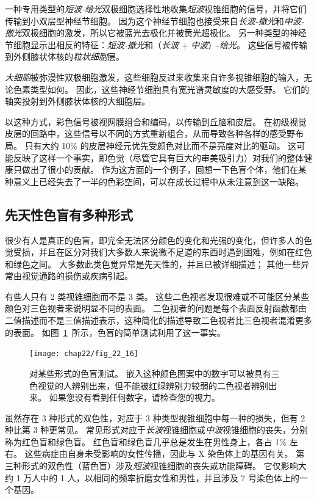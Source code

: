 一种专用类型的\textit{短波-给光}双极细胞选择性地收集\textit{短波}视锥细胞的信号，并将它们传输到小双层型神经节细胞。
因为这个神经节细胞也接受来自\textit{长波-撤光}和\textit{中波-撤光}双极细胞的激发，所以它被蓝光去极化并被黄光超极化。
另一种类型的神经节细胞显示出相反的特征：\textit{短波-撤光}和（\textit{长波} + \textit{中波}）-\textit{给光}。
这些信号被传输到外侧膝状体核的\textit{粒状细胞}层。


\textit{大细胞}被弥漫性双极细胞激发，这些细胞反过来收集来自许多视锥细胞的输入，无论色素类型如何。
因此，这些神经节细胞具有宽光谱灵敏度的大感受野。
它们的轴突投射到外侧膝状体核的大细胞层。


以这种方式，彩色信号被视网膜组合和编码，以传输到丘脑和皮层。
在初级视觉皮层的回路中，这些信号以不同的方式重新组合，从而导致各种各样的感受野布局。
只有大约 10\% 的皮层神经元优先受颜色对比而不是亮度对比的驱动。
这可能反映了这样一个事实，即色觉（尽管它具有巨大的审美吸引力）对我们的整体健康只做出了很小的贡献。
作为这方面的一个例子，回想一下色盲个体，他们在某种意义上已经失去了一半的色彩空间，可以在成长过程中从未注意到这一缺陷。



\subsection{先天性色盲有多种形式}

很少有人是真正的色盲，即完全无法区分颜色的变化和光强的变化，但许多人的色觉受损，并且在区分对我们大多数人来说微不足道的东西时遇到困难，例如在红色和绿色之间。
大多数此类色觉异常是先天性的，并且已被详细描述；
其他一些异常由视觉通路的损伤或疾病引起。


有些人只有 2 类视锥细胞而不是 3 类。
这些二色视者发现很难或不可能区分某些颜色对三色视者来说明显不同的表面。
二色视者的问题是每个表面反射函数都由二值描述而不是三值描述表示，这种简化的描述导致二色视者比三色视者混淆更多的表面。
如图~\ref{fig:22_16}~所示，色盲的简单测试利用了这一事实。


\begin{figure}[htbp]
	\centering
	\texttt{[image: chap22/fig\_22\_16]}
	\caption{对某些形式的色盲测试。
		嵌入这种颜色图案中的数字可以被具有三色视觉的人辨别出来，但不能被红绿辨别力较弱的二色视者辨别出来。 
		如果您没有看到任何数字，请检查您的视力。}
	\label{fig:22_16}
\end{figure}


虽然存在 3 种形式的双色性，对应于 3 种类型视锥细胞中每一种的损失，但有 2 种比第 3 种更常见。
常见形式对应于\textit{长波}视锥细胞或\textit{中波}视锥细胞的丧失，分别称为红色盲和绿色盲。
红色盲和绿色盲几乎总是发生在男性身上，各占 1\% 左右。
这些病症由自身未受影响的女性传播，因此与 X 染色体上的基因有关。
第三种形式的双色性（蓝色盲）涉及\textit{短波}视锥细胞的丧失或功能障碍。
它仅影响大约 1 万人中的 1 人，以相同的频率折磨女性和男性，并且涉及 7 号染色体上的一个基因。


